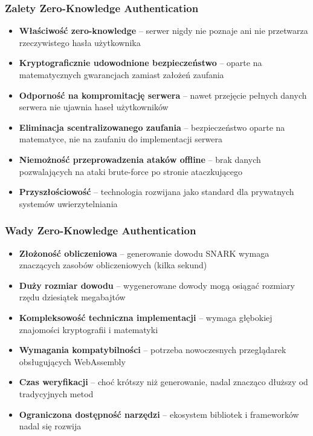 \documentclass{article}
\begin{document}
\subsubsection{Zalety Zero-Knowledge Authentication}
\begin{itemize}
    \item \textbf{Właściwość zero-knowledge} – serwer nigdy nie poznaje ani nie przetwarza rzeczywistego hasła użytkownika
    \item \textbf{Kryptograficznie udowodnione bezpieczeństwo} – oparte na matematycznych gwarancjach zamiast założeń zaufania
    \item \textbf{Odporność na kompromitację serwera} – nawet przejęcie pełnych danych serwera nie ujawnia haseł użytkowników
    \item \textbf{Eliminacja scentralizowanego zaufania} – bezpieczeństwo oparte na matematyce, nie na zaufaniu do implementacji serwera
    \item \textbf{Niemożność przeprowadzenia ataków offline} – brak danych pozwalających na ataki brute-force po stronie ataczkującego
    \item \textbf{Przyszłościowość} – technologia rozwijana jako standard dla prywatnych systemów uwierzytelniania
\end{itemize}

\subsubsection{Wady Zero-Knowledge Authentication}
\begin{itemize}
    \item \textbf{Złożoność obliczeniowa} – generowanie dowodu SNARK wymaga znaczących zasobów obliczeniowych (kilka sekund)
    \item \textbf{Duży rozmiar dowodu} – wygenerowane dowody mogą osiągać rozmiary rzędu dziesiątek megabajtów
    \item \textbf{Kompleksowość techniczna implementacji} – wymaga głębokiej znajomości kryptografii i matematyki
    \item \textbf{Wymagania kompatybilności} – potrzeba nowoczesnych przeglądarek obsługujących WebAssembly
    \item \textbf{Czas weryfikacji} – choć krótszy niż generowanie, nadal znacząco dłuższy od tradycyjnych metod
    \item \textbf{Ograniczona dostępność narzędzi} – ekosystem bibliotek i frameworków nadal się rozwija
\end{itemize}
\end{document}
